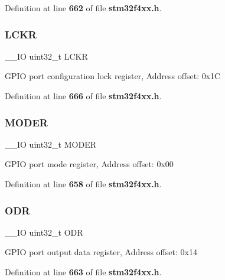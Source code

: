 Definition at line \textbf{ 662} of file \textbf{ stm32f4xx.\+h}.

\mbox{\label{structGPIO__TypeDef_a2612a0f4b3fbdbb6293f6dc70105e190}} 
\subsubsection{L\+C\+KR}
{\footnotesize\ttfamily \+\_\+\+\_\+\+IO uint32\+\_\+t L\+C\+KR}

G\+P\+IO port configuration lock register, Address offset\+: 0x1C 

Definition at line \textbf{ 666} of file \textbf{ stm32f4xx.\+h}.

\mbox{\label{structGPIO__TypeDef_a2b671a94c63a612f81e0e9de8152d01c}} 
\subsubsection{M\+O\+D\+ER}
{\footnotesize\ttfamily \+\_\+\+\_\+\+IO uint32\+\_\+t M\+O\+D\+ER}

G\+P\+IO port mode register, Address offset\+: 0x00 

Definition at line \textbf{ 658} of file \textbf{ stm32f4xx.\+h}.

\mbox{\label{structGPIO__TypeDef_abff7fffd2b5a718715a130006590c75c}} 
\subsubsection{O\+DR}
{\footnotesize\ttfamily \+\_\+\+\_\+\+IO uint32\+\_\+t O\+DR}

G\+P\+IO port output data register, Address offset\+: 0x14 

Definition at line \textbf{ 663} of file \textbf{ stm32f4xx.\+h}.

\mbox{\label{structGPIO__TypeDef_a328d16cc6213783ede54e4059ffd50a3}} 
